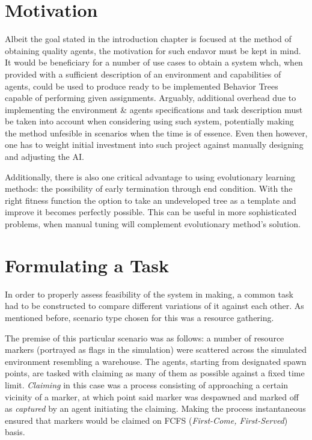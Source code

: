 \section{Motivation} %
Albeit the goal stated in the introduction chapter is focused at the method of obtaining quality agents, the motivation for such endavor must be kept in mind. It would be beneficiary for a number of use cases to obtain a system whch, when provided with a sufficient description of an environment and capabilities of agents, could be used to produce ready to be implemented Behavior Trees capable of performing given assignments. Arguably, additional overhead due to implementing the environment \& agents specifications and task description must be taken into account when considering using such system, potentially making the method unfesible in scenarios when the time is of essence. Even then however, one has to weight initial investment into such project against manually designing and adjusting the AI. %

Additionally, there is also one critical advantage to using evolutionary learning methods: the possibility of early termination through end condition. With the right fitness function the option to take an undeveloped tree as a template and improve it becomes perfectly possible. This can be useful in more sophisticated problems, when manual tuning will complement evolutionary method's solution. %
\section{Formulating a Task}
In order to properly assess feasibility of the system in making, a common task had to be constructed to compare different variations of it against each other. As mentioned before, scenario type chosen for this was a resource gathering.

The premise of this particular scenario was as follows: a number of resource markers (portrayed as flags in the simulation) were scattered across the simulated environment resembling a warehouse. The agents, starting from designated spawn points, are tasked with claiming as many of them as possible against a fixed time limit. \textit{Claiming} in this case was a process consisting of approaching a certain vicinity of a marker, at which point said marker was despawned and marked off as \textit{captured} by an agent initiating the claiming. Making the process instantaneous ensured that markers would be claimed on FCFS (\textit{First-Come, First-Served}) basis.

